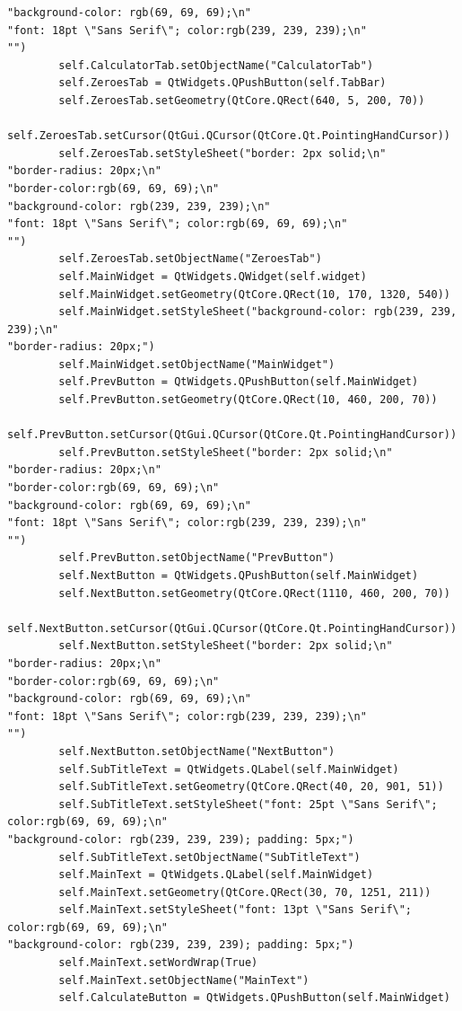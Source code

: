 \documentclass{article}
\begin{document}
\begin{lstlisting}
"background-color: rgb(69, 69, 69);\n"
"font: 18pt \"Sans Serif\"; color:rgb(239, 239, 239);\n"
"")
        self.CalculatorTab.setObjectName("CalculatorTab")
        self.ZeroesTab = QtWidgets.QPushButton(self.TabBar)
        self.ZeroesTab.setGeometry(QtCore.QRect(640, 5, 200, 70))
        self.ZeroesTab.setCursor(QtGui.QCursor(QtCore.Qt.PointingHandCursor))
        self.ZeroesTab.setStyleSheet("border: 2px solid;\n"
"border-radius: 20px;\n"
"border-color:rgb(69, 69, 69);\n"
"background-color: rgb(239, 239, 239);\n"
"font: 18pt \"Sans Serif\"; color:rgb(69, 69, 69);\n"
"")
        self.ZeroesTab.setObjectName("ZeroesTab")
        self.MainWidget = QtWidgets.QWidget(self.widget)
        self.MainWidget.setGeometry(QtCore.QRect(10, 170, 1320, 540))
        self.MainWidget.setStyleSheet("background-color: rgb(239, 239, 239);\n"
"border-radius: 20px;")
        self.MainWidget.setObjectName("MainWidget")
        self.PrevButton = QtWidgets.QPushButton(self.MainWidget)
        self.PrevButton.setGeometry(QtCore.QRect(10, 460, 200, 70))
        self.PrevButton.setCursor(QtGui.QCursor(QtCore.Qt.PointingHandCursor))
        self.PrevButton.setStyleSheet("border: 2px solid;\n"
"border-radius: 20px;\n"
"border-color:rgb(69, 69, 69);\n"
"background-color: rgb(69, 69, 69);\n"
"font: 18pt \"Sans Serif\"; color:rgb(239, 239, 239);\n"
"")
        self.PrevButton.setObjectName("PrevButton")
        self.NextButton = QtWidgets.QPushButton(self.MainWidget)
        self.NextButton.setGeometry(QtCore.QRect(1110, 460, 200, 70))
        self.NextButton.setCursor(QtGui.QCursor(QtCore.Qt.PointingHandCursor))
        self.NextButton.setStyleSheet("border: 2px solid;\n"
"border-radius: 20px;\n"
"border-color:rgb(69, 69, 69);\n"
"background-color: rgb(69, 69, 69);\n"
"font: 18pt \"Sans Serif\"; color:rgb(239, 239, 239);\n"
"")
        self.NextButton.setObjectName("NextButton")
        self.SubTitleText = QtWidgets.QLabel(self.MainWidget)
        self.SubTitleText.setGeometry(QtCore.QRect(40, 20, 901, 51))
        self.SubTitleText.setStyleSheet("font: 25pt \"Sans Serif\"; color:rgb(69, 69, 69);\n"
"background-color: rgb(239, 239, 239); padding: 5px;")
        self.SubTitleText.setObjectName("SubTitleText")
        self.MainText = QtWidgets.QLabel(self.MainWidget)
        self.MainText.setGeometry(QtCore.QRect(30, 70, 1251, 211))
        self.MainText.setStyleSheet("font: 13pt \"Sans Serif\"; color:rgb(69, 69, 69);\n"
"background-color: rgb(239, 239, 239); padding: 5px;")
        self.MainText.setWordWrap(True)
        self.MainText.setObjectName("MainText")
        self.CalculateButton = QtWidgets.QPushButton(self.MainWidget)

\end{lstlisting}
\end{document}
